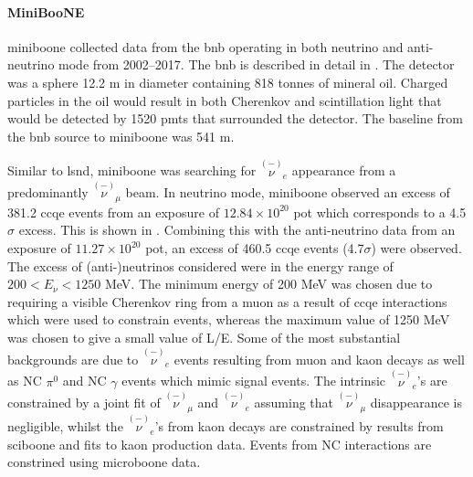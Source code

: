 \paragraph{MiniBooNE}
\gls{miniboone} collected data from the \gls{bnb} operating in both neutrino and anti-neutrino mode from 2002--2017. The \gls{bnb} is described in detail in . The detector was a sphere 12.2 m in diameter containing 818 tonnes of mineral oil. Charged particles in the oil would result in both Cherenkov and scintillation light that would be detected by 1520 \glspl{pmt} that surrounded the detector. The baseline from the \gls{bnb} source to \gls{miniboone} was 541 m.

Similar to \gls{lsnd}, \gls{miniboone} was searching for $\overset{(-)}{\nu}_{\!\!e}$ appearance from a predominantly $\overset{(-)}{\nu}_{\!\!\mu}$ beam. In neutrino mode, \gls{miniboone} observed an excess of 381.2 \gls{ccqe} events from an exposure of $12.84 \times 10^{20}$ \gls{pot} which corresponds to a 4.5$\sigma$ excess. This is shown in . Combining this with the anti-neutrino data from an exposure of $11.27 \times 10^{20}$ \gls{pot}, an excess of 460.5 \gls{ccqe} events (4.7$\sigma$) were observed. The excess of (anti-)neutrinos considered were in the energy range of $200 < E_\nu < 1250$ MeV. The minimum energy of 200 MeV was chosen due to requiring a visible Cherenkov ring from a muon as a result of \numu \gls{ccqe} interactions which were used to constrain \nue events, whereas the maximum value of 1250 MeV was chosen to give a small value of L/E. Some of the most substantial backgrounds are due to $\overset{(-)}{\nu}_{\!\!e}$ events resulting from muon and kaon decays as well as NC $\pi^0$ and NC $\gamma$ events which mimic signal events. The intrinsic $\overset{(-)}{\nu}_{\!\!e}$'s are constrained by a joint fit of $\overset{(-)}{\nu}_{\!\!\mu}$ and $\overset{(-)}{\nu}_{\!\!e}$ assuming that $\overset{(-)}{\nu}_{\!\!\mu}$ disappearance is negligible, whilst the $\overset{(-)}{\nu}_{\!\!e}$'s from kaon decays are constrained by results from \gls{sciboone} and fits to kaon production data. Events from NC interactions are constrined using \gls{microboone} data. 

